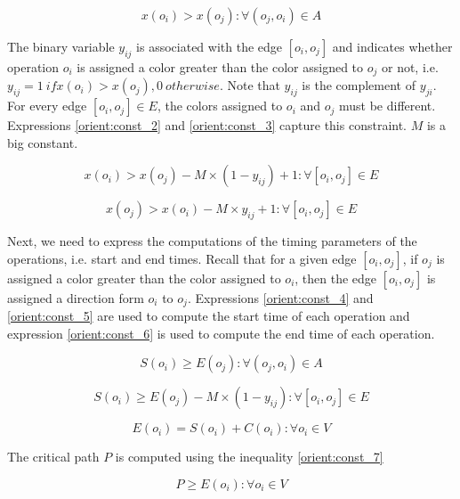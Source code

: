 \begin{equation}
x(o_i) > x(o_j): \forall (o_j,o_i) \in A
\label{orient:const_1}
\end{equation}

The binary variable $y_{ij}$ is associated with the edge $[o_i,o_j]$ and indicates whether operation $o_i$ is assigned a color greater than the color assigned to $o_j$ or not, i.e. $y_{ij} = 1\ if x(o_i) > x(o_j), 0\ otherwise$. Note that $y_{ij}$ is the complement of $y_{ji}$. For every edge $[o_i,o_j] \in E$, the colors assigned to $o_i$ and $o_j$ must be different. Expressions \ref{orient:const_2} and \ref{orient:const_3} capture this constraint. $M$ is a big constant.

\begin{equation}
x(o_i) > x(o_j) - M \times (1-y_{ij}) + 1: \forall [o_i,o_j] \in E
\label{orient:const_2}
\end{equation} 

\begin{equation}
x(o_j) > x(o_i) - M \times y_{ij} + 1: \forall [o_i,o_j] \in E
\label{orient:const_3}
\end{equation}

Next, we need to express the computations of the timing parameters of the operations, i.e. start and end times. Recall that for a given edge $[o_i,o_j]$, if $o_j$ is assigned a color greater than the color assigned to $o_i$, then the edge $[o_i, o_j]$ is assigned a direction form $o_i$ to $o_j$. Expressions \ref{orient:const_4} and \ref{orient:const_5} are used to compute the start time of each operation and expression \ref{orient:const_6} is used to compute the end time of each operation.

\begin{equation}
S(o_i) \geq E(o_j): \forall (o_j,o_i) \in A
\label{orient:const_4}
\end{equation} 

\begin{equation}
S(o_i) \geq E(o_j) - M \times (1-y_{ij}): \forall [o_i,o_j] \in E
\label{orient:const_5}
\end{equation}

\begin{equation}
E(o_i) = S(o_i) + C(o_i): \forall o_i \in V
\label{orient:const_6}
\end{equation}
 
The critical path $P$ is computed using the inequality \ref{orient:const_7}

\begin{equation}
P \geq E(o_i): \forall o_i \in V
\label{orient:const_7}
\end{equation}

